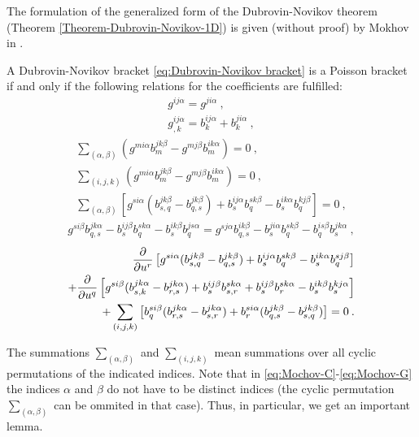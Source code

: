 The formulation of the generalized form of the Dubrovin-Novikov theorem (Theorem \vref{Theorem-Dubrovin-Novikov-1D}) is given (without proof) by Mokhov in \cite{Mochov}.

\begin{theorem}
    A Dubrovin-Novikov bracket \eqref{eq:Dubrovin-Novikov bracket} is a Poisson bracket if and only if the following relations for the coefficients are fulfilled:
    \begin{align}
        g^{ij \alpha} = g^{ji \alpha} \:, \label{eq:Mochov-A} \\
        g^{ij \alpha}_{,k} = b^{ij \alpha}_k + b^{ji \alpha}_k \:, \label{eq:Mochov-B}
    \end{align}
    \begin{align}
        \sum_{(\alpha, \beta)} (g^{mi \alpha} b^{jk \beta}_m - g^{m j \beta} b^{i k \alpha}_m) = 0 \:, \label{eq:Mochov-C}\\
        \sum_{(i,j,k)} (g^{mi \alpha} b^{jk \beta}_m - g^{m j \beta} b^{ik \alpha}_m) = 0 \:, \label{eq:Mochov-D}\\
        \sum_{(\alpha, \beta)} \left[ g^{si \alpha} (b^{jk \beta}_{s,q} - b^{jk \beta}_{q,s} ) + b^{ij \alpha}_s b^{s k \beta}_q - b^{i k \alpha}_s b^{k j \beta}_q \right] = 0 \label{eq:Mochov-E}\:,
    \end{align}
    \begin{align}
        g^{si \beta} b^{j k \alpha}_{q,s} - b^{ij \beta}_s b^{s k \alpha}_q - b^{i k \beta}_s b^{j s \alpha}_q = g^{s j \alpha} b^{i k \beta}_{q,s} - b^{ji \alpha}_s b^{s k \beta}_q - b^{is \beta}_q b^{jk \alpha}_s \label{eq:Mochov-F}\:,
    \end{align}
    \begin{align}
        \frac{\partial }{\partial u^r} \left[ g^{si \alpha} (b^{j k \beta}_{s,q} - b^{j k \beta}_{q,s}) + b^{ij \alpha}_s b^{s k \beta}_q - b^{i k \alpha}_s b^{s j \beta}_q \right] 
        \nonumber \\+ \frac{\partial }{\partial u^q} \left[ g^{si \beta} (b^{j k  \alpha}_{s,k} - b^{j k \alpha}_{r,s}) + b^{ij \beta}_s b^{s k \alpha}_{s,r} + b^{ij \beta}_s b^{s k \alpha}_r - b^{i k \beta}_s b^{k j \alpha}_s \right] \label{eq:Mochov-G}
        \\+ \sum_{(i,j,k)} \left[ b^{si \beta}_q (b^{j k \alpha}_{r,s} - b^{j k \alpha}_{s,r}) + b^{s i \alpha}_r (b^{j k \beta}_{q,s} - b^{j k \beta}_{s,q}) \right] \nonumber
        = 0 \:.
    \end{align}
\end{theorem}
The summations $\sum_{(\alpha, \beta)}$ and $\sum_{(i,j,k)}$ mean summations over all cyclic permutations of the indicated indices. Note that in \eqref{eq:Mochov-C}-\eqref{eq:Mochov-G} the indices $\alpha$ and $\beta$ do not have to be distinct indices (the cyclic permutation $\sum_{(\alpha, \beta)}$ can be ommited in that case). Thus, in particular, we get an important lemma.
